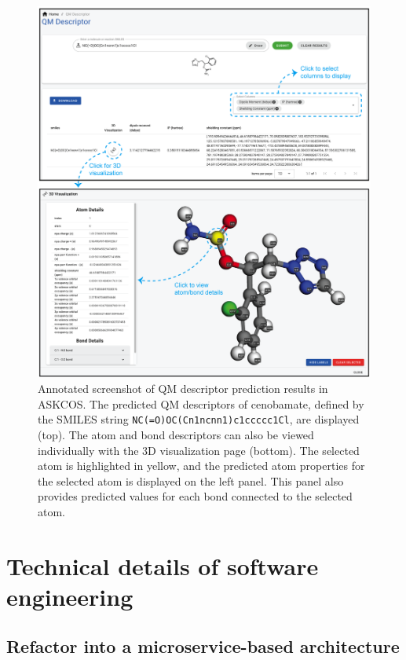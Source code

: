 \documentclass[pdflatex,sn-mathphys-num]{sn-jnl}%
\theoremstyle{thmstyleone}%
\theoremstyle{thmstyletwo}%
\theoremstyle{thmstylethree}%
\begin{document}
\begin{figure}[h!]
\centering
\includegraphics[width=1.0\textwidth]{media/S3.QM_feature_prediction.png}
\caption{Annotated screenshot of QM descriptor prediction results in ASKCOS. The predicted QM descriptors of cenobamate, defined by the SMILES string \texttt{NC(=O)OC(Cn1ncnn1)c1ccccc1Cl}, are displayed (top). The atom and bond descriptors can also be viewed individually with the 3D visualization page (bottom). The selected atom is highlighted in yellow, and the predicted atom properties for the selected atom is displayed on the left panel. This panel also provides predicted values for each bond connected to the selected atom.}\label{fig_qm_descriptors}
\end{figure}

\newpage
\section{Technical details of software engineering}\label{method_software}

\subsection{Refactor into a microservice-based architecture}
\end{document}
